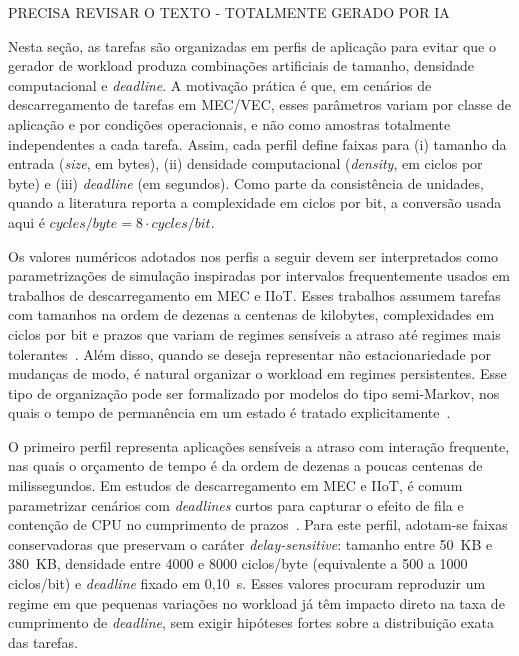 {\color{red}\Large PRECISA REVISAR O TEXTO - TOTALMENTE GERADO POR IA}

Nesta seção, as tarefas são organizadas em perfis de aplicação para evitar que o gerador de workload produza combinações artificiais de tamanho, densidade computacional e \textit{deadline}. A motivação prática é que, em cenários de descarregamento de tarefas em \gls{MEC}/\gls{VEC}, esses parâmetros variam por classe de aplicação e por condições operacionais, e não como amostras totalmente independentes a cada tarefa. Assim, cada perfil define faixas para (i) tamanho da entrada (\textit{size}, em bytes), (ii) densidade computacional (\textit{density}, em ciclos por byte) e (iii) \textit{deadline} (em segundos). Como parte da consistência de unidades, quando a literatura reporta a complexidade em ciclos por bit, a conversão usada aqui é $\textit{cycles/byte} = 8 \cdot \textit{cycles/bit}$.

Os valores numéricos adotados nos perfis a seguir devem ser interpretados como parametrizações de simulação inspiradas por intervalos frequentemente usados em trabalhos de descarregamento em \gls{MEC} e IIoT. Esses trabalhos assumem tarefas com tamanhos na ordem de dezenas a centenas de kilobytes, complexidades em ciclos por bit e prazos que variam de regimes sensíveis a atraso até regimes mais tolerantes~\cite{akbari2022drl_os_sensors,hao2021risk_sensitive_iiot_jwcn,yang2019industrial_iiot_ieee_network}. Além disso, quando se deseja representar não estacionariedade por mudanças de modo, é natural organizar o workload em regimes persistentes. Esse tipo de organização pode ser formalizado por modelos do tipo semi-Markov, nos quais o tempo de permanência em um estado é tratado explicitamente~\cite{limnios2001semi_markov_reliability}.

O primeiro perfil representa aplicações sensíveis a atraso com interação frequente, nas quais o orçamento de tempo é da ordem de dezenas a poucas centenas de milissegundos. Em estudos de descarregamento em \gls{MEC} e IIoT, é comum parametrizar cenários com \textit{deadlines} curtos para capturar o efeito de fila e contenção de \gls{CPU} no cumprimento de prazos~\cite{akbari2022drl_os_sensors,hao2021risk_sensitive_iiot_jwcn}. Para este perfil, adotam-se faixas conservadoras que preservam o caráter \textit{delay-sensitive}: tamanho entre 50~KB e 380~KB, densidade entre 4000 e 8000 ciclos/byte (equivalente a 500 a 1000 ciclos/bit) e \textit{deadline} fixado em 0{,}10~s. Esses valores procuram reproduzir um regime em que pequenas variações no workload já têm impacto direto na taxa de cumprimento de \textit{deadline}, sem exigir hipóteses fortes sobre a distribuição exata das tarefas.

